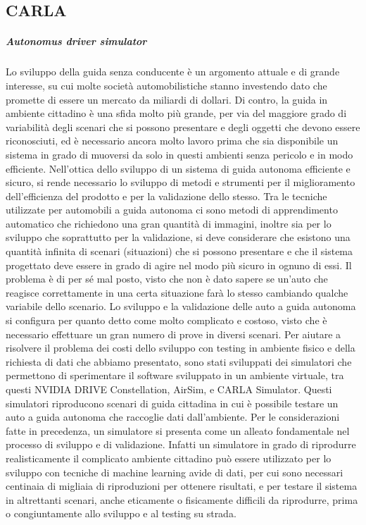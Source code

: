\documentclass[14pt]{extarticle}
\begin{document}
\subsection{CARLA}
\subparagraph{Autonomus driver simulator}
Lo sviluppo della guida senza conducente è un argomento attuale e di
grande interesse, su cui molte società automobilistiche stanno investendo
dato che promette di essere un mercato da miliardi di dollari. %
Di contro, la guida in ambiente cittadino è una sfida
molto più grande, per via del maggiore grado di variabilità degli scenari
che si possono presentare e degli oggetti che devono essere riconosciuti,
ed è necessario ancora molto lavoro prima che sia disponibile un sistema
in grado di muoversi da solo in questi ambienti senza pericolo e in modo
efficiente.
Nell’ottica dello sviluppo di un sistema di guida autonoma efficiente
e sicuro, si rende necessario lo sviluppo di metodi e strumenti per il
miglioramento dell’efficienza del prodotto e per la validazione dello
stesso. Tra le tecniche utilizzate per automobili a guida autonoma ci sono
metodi di apprendimento automatico che richiedono una gran quantità di
immagini, inoltre sia per lo sviluppo che soprattutto per la validazione, si
deve considerare che esistono una quantità infinita di scenari (situazioni)
che si possono presentare e che il sistema progettato deve essere in grado
di agire nel modo più sicuro in ognuno di essi. Il problema è di per sé mal
posto, visto che non è dato sapere se un’auto che reagisce correttamente
in una certa situazione farà lo stesso cambiando qualche variabile dello
scenario.
Lo sviluppo e la validazione delle auto a guida autonoma si configura
per quanto detto come molto complicato e costoso, visto che è necessario
effettuare un gran numero di prove in diversi scenari.
Per aiutare a risolvere il problema dei costi dello sviluppo con testing
in ambiente fisico e della richiesta di dati che abbiamo presentato, sono
stati sviluppati dei simulatori che permettono di sperimentare il software
sviluppato in un ambiente virtuale, tra questi NVIDIA DRIVE Constellation, AirSim, e CARLA Simulator. Questi simulatori riproducono scenari di guida cittadina
in cui è possibile testare un auto a guida autonoma che raccoglie dati
dall’ambiente. Per le considerazioni fatte in precedenza, un simulatore
si presenta come un alleato fondamentale nel processo di sviluppo e di
validazione. Infatti un simulatore in grado di riprodurre realisticamente
il complicato ambiente cittadino può essere utilizzato per lo sviluppo
con tecniche di machine learning avide di dati, per cui sono necessari
centinaia di migliaia di riproduzioni per ottenere risultati, e per testare il
sistema in altrettanti scenari, anche eticamente o fisicamente difficili da
riprodurre, prima o congiuntamente allo sviluppo e al testing su strada.
\end{document}
